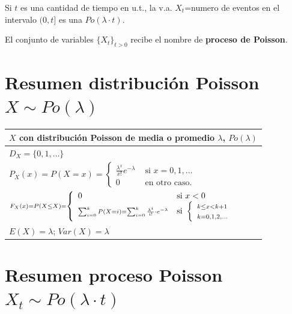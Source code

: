 \documentclass[
  letterpaper,
  DIV=11,
  numbers=noendperiod]{scrreprt}
\begin{document}
Si \(t\) es una cantidad de tiempo en u.t., la v.a. \(X_{t}\)=numero de
eventos en el intervalo \((0,t]\) es una \(Po(\lambda\cdot t)\).

El conjunto de variables \(\{X_t\}_{t>0}\) recibe el nombre de
\textbf{proceso de Poisson}.

\section{\texorpdfstring{Resumen distribución Poisson
\(X\sim Po(\lambda)\)}{Resumen distribución Poisson X\textbackslash sim Po(\textbackslash lambda)}}\label{resumen-distribuciuxf3n-poisson-xsim-polambda}

\renewcommand{\arraystretch}{1.75}
\begin{table}
\centering
\begin{tabular}{|l|}
\hline\rowcolor{LightBlue}
$X$ con distribución  Poisson  de media o promedio $\lambda$,  $Po(\lambda)$
\\\hline
$D_X=\{0,1,\ldots \}$ \\\hline
$P_X(x)=P(X=x)=\left\{\begin{array}{ll}  \frac{\lambda^x}{x!}e^{-\lambda} & \mbox{ si } x=0,1,\ldots\\ 0  & \mbox{ en otro caso.}\end{array}\right.$\\\hline
$\scriptstyle F_X(x)=P(X\leq X)=\left\{\begin{array}{ll} 0 & \mbox{si } x<0\\\displaystyle\scriptstyle\sum_{i=0}^{k} P(X=i)= \displaystyle\scriptstyle\sum_{i=0}^{k} \frac{\lambda^i}{i!}\cdot e^{-\lambda} & \mbox{si  }\left\{\begin{array}{l}\scriptstyle k\leq x< k+1\\\scriptstyle k=0,1,2,\ldots\end{array}\right.\end{array}\right.$
     \\\hline
$E(X)=\lambda$; $Var(X)=\lambda$\\\hline
\end{tabular}
\end{table}

\section{\texorpdfstring{Resumen proceso Poisson
\(X_t\sim Po(\lambda\cdot t)\)}{Resumen proceso Poisson X\_t\textbackslash sim Po(\textbackslash lambda\textbackslash cdot t)}}\label{resumen-proceso-poisson-x_tsim-polambdacdot-t}
\end{document}
